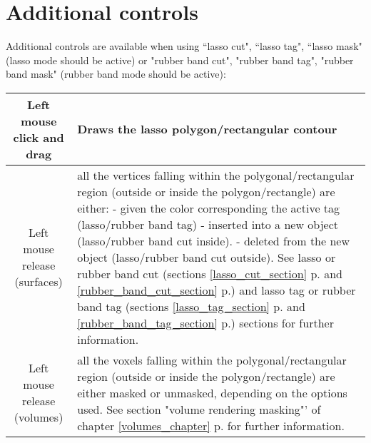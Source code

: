 \section{Additional controls}
Additional controls are available when using ``lasso cut",  ``lasso tag",  ``lasso mask"  (lasso mode should be active) or "rubber band cut", "rubber band tag", "rubber band mask" (rubber band mode should be active):\\
\begin{tabularx}{\linewidth}{ | c | X | }
\hline			
Left mouse click and drag & Draws the lasso polygon/rectangular contour\\ \hline			

Left mouse release (surfaces)&  all the vertices falling within the polygonal/rectangular region (outside or inside the polygon/rectangle) are either:\newline
- given the color corresponding the active tag (lasso/rubber band tag)\newline
- inserted into a new object (lasso/rubber band cut inside).\newline 
- deleted from the new object (lasso/rubber band cut outside).\newline 
See lasso or rubber band cut (sections \ref{lasso_cut_section} p.\pageref{lasso_cut_section} and \ref{rubber_band_cut_section} p.\pageref{rubber_band_cut_section}) and lasso tag or rubber band tag (sections \ref{lasso_tag_section} p.\pageref{lasso_tag_section} and \ref{rubber_band_tag_section} p.\pageref{rubber_band_tag_section}) sections for further information.\\ \hline	
		
Left mouse release (volumes)&  all the voxels falling within the polygonal/rectangular region (outside or inside the polygon/rectangle) are either masked or unmasked, depending on the options used. See section "volume rendering masking"' of chapter \ref{volumes_chapter}  p.\pageref{volume_rendering_masking}  for further information.\\ \hline	
\end{tabularx}

